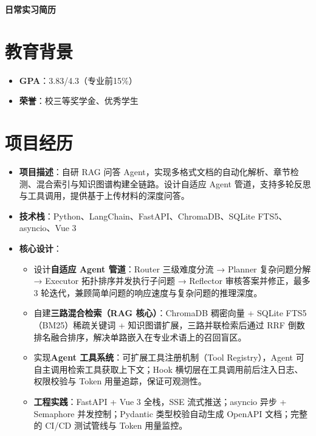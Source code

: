 \documentclass{resume}
\begin{document}

\textbf{\LARGE \hspace{15em}日常实习简历}\\
\sepspace
{}


\section{教育背景}
\begin{itemize}
  \item \textbf{GPA}：3.83/4.3（专业前15\%）
  \item \textbf{荣誉}：校三等奖学金、优秀学生
\end{itemize}

\section{项目经历}

  \begin{itemize}
      \item \textbf{项目描述}：自研 RAG 问答 Agent，实现多格式文档的自动化解析、章节检测、混合索引与知识图谱构建全链路。设计自适应 Agent 管道，支持多轮反思与工具调用，提供基于上传材料的深度问答。
      \item \textbf{技术栈}：Python、LangChain、FastAPI、ChromaDB、SQLite FTS5、asyncio、Vue 3
      \item \textbf{核心设计}：
      \begin{itemize}
          \item 设计\textbf{自适应 Agent 管道}：Router 三级难度分流 → Planner 复杂问题分解 → Executor 拓扑排序并发执行子问题 → Reflector 审核答案并修正，最多 3 轮迭代，兼顾简单问题的响应速度与复杂问题的推理深度。

          \item 自建\textbf{三路混合检索（RAG 核心）}：ChromaDB 稠密向量 + SQLite FTS5（BM25）稀疏关键词 + 知识图谱扩展，三路并联检索后通过 RRF 倒数排名融合排序，解决单路嵌入在专业术语上的召回盲区。

          \item 实现\textbf{Agent 工具系统}：可扩展工具注册机制（Tool Registry），Agent 可自主调用检索工具获取上下文；Hook 横切层在工具调用前后注入日志、权限校验与 Token 用量追踪，保证可观测性。

          \item \textbf{工程实践}：FastAPI + Vue 3 全栈，SSE 流式推送；asyncio 异步 + Semaphore 并发控制；Pydantic 类型校验自动生成 OpenAPI 文档；完整的 CI/CD 测试管线与 Token 用量监控。
      \end{itemize}
  \end{itemize}
\end{document}
